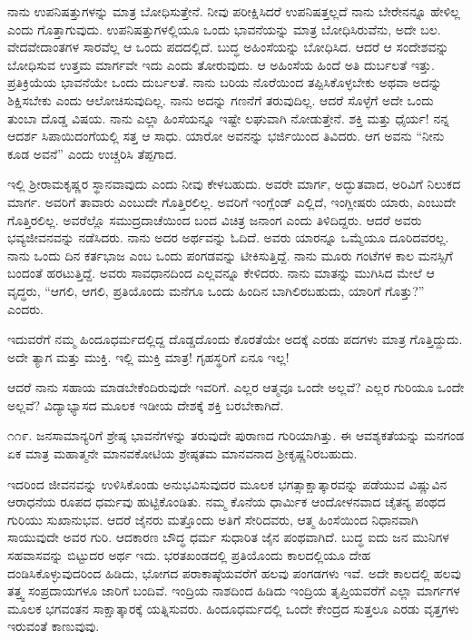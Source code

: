 ನಾನು ಉಪನಿಷತ್ತುಗಳನ್ನು ಮಾತ್ರ ಬೋಧಿಸುತ್ತೇನೆ. ನೀವು ಪರೀಕ್ಷಿಸಿದರೆ ಉಪನಿಷತ್ತಲ್ಲದೆ ನಾನು ಬೇರೇನನ್ನೂ ಹೇಳಿಲ್ಲ ಎಂದು ಗೊತ್ತಾಗುವುದು. ಉಪನಿಷತ್ತುಗಳಲ್ಲಿಯೂ ಒಂದು ಭಾವನೆಯನ್ನು ಮಾತ್ರ ಬೋಧಿಸಿರುವೆನು, ಅದೇ ಬಲ. ವೇದವೇದಾಂತಗಳ ಸಾರವೆಲ್ಲ ಆ ಒಂದು ಪದದಲ್ಲಿದೆ. ಬುದ್ಧ ಅಹಿಂಸೆಯನ್ನು ಬೋಧಿಸಿದ. ಆದರೆ ಆ ಸಂದೇಶವನ್ನು ಬೋಧಿಸುವ ಉತ್ತಮ ಮಾರ್ಗವೇ ಇದು ಎಂದು ತೋರುವುದು. ಆ ಅಹಿಂಸೆಯ ಹಿಂದೆ ಅತಿ ದುರ್ಬಲತೆ ಇತ್ತು. ಪ್ರತಿಕ್ರಿಯೆಯ ಭಾವನೆಯೇ ಒಂದು ದುರ್ಬಲತೆ. ನಾನು ಬರಿಯ ನೊರೆಯಿಂದ ತಪ್ಪಿಸಿಕೊಳ್ಳಬೇಕು ಅಥವಾ ಅದನ್ನು ಶಿಕ್ಷಿಸಬೇಕು ಎಂದು ಆಲೋಚಿಸುವುದಿಲ್ಲ. ನಾನು ಅದನ್ನು ಗಣನೆಗೆ ತರುವುದಿಲ್ಲ. ಆದರೆ ಸೊಳ್ಳೆಗೆ ಅದೇ ಒಂದು ತುಂಬಾ ದೊಡ್ಡ ವಿಷಯ. ನಾನು ಎಲ್ಲಾ ಹಿಂಸೆಯನ್ನೂ ಇಷ್ಟೇ ಲಘುವಾಗಿ ನೋಡುತ್ತೇನೆ. ಶಕ್ತಿ ಮತ್ತು ಧೈರ್ಯ! ನನ್ನ ಆದರ್ಶ ಸಿಪಾಯಿದಂಗೆಯಲ್ಲಿ ಸತ್ತ ಆ ಸಾಧು. ಯಾರೋ ಅವನನ್ನು ಭರ್ಜಿಯಿಂದ ತಿವಿದರು. ಆಗ ಅವನು “ನೀನು ಕೂಡ ಅವನೆ” ಎಂದು ಉಚ್ಚರಿಸಿ ತೆಪ್ಪಗಾದ.

ಇಲ್ಲಿ ಶ‍್ರೀರಾಮಕೃಷ್ಣರ ಸ್ಥಾನವಾವುದು ಎಂದು ನೀವು ಕೇಳಬಹುದು. ಅವರೇ ಮಾರ್ಗ, ಅದ್ಭುತವಾದ, ಅರಿವಿಗೆ ನಿಲುಕದ ಮಾರ್ಗ. ಅವರಿಗೆ ತಾವಾರು ಎಂಬುದೇ ಗೊತ್ತಿರಲಿಲ್ಲ. ಅವರಿಗೆ ಇಂಗ್ಲೆಂಡ್ ಎಲ್ಲಿದೆ, ಇಂಗ್ಲೀಷರು ಯಾರು, ಎಂಬುದೇ ಗೊತ್ತಿರಲಿಲ್ಲ. ಅವರೆಲ್ಲೊ ಸಮುದ್ರದಾಚೆಯಿಂದ ಬಂದ ವಿಚಿತ್ರ ಜನಾಂಗ ಎಂದು ತಿಳಿದಿದ್ದರು. ಆದರೆ ಅವರು ಭವ್ಯಜೀವನವನ್ನು ನಡೆಸಿದರು. ನಾನು ಅದರ ಅರ್ಥವನ್ನು ಓದಿದೆ. ಅವರು ಯಾರನ್ನೂ ಒಮ್ಮೆಯೂ ದೂರಿದವರಲ್ಲ. ನಾನು ಒಂದು ದಿನ ಕರ್ತಭಾಜ ಎಂಬ ಒಂದು ಪಂಗಡವನ್ನು ಟೀಕಿಸುತ್ತಿದ್ದೆ. ನಾನು ಮೂರು ಗಂಟೆಗಳ ಕಾಲ ಮನಸ್ಸಿಗೆ ಬಂದಂತೆ ಹರಟುತ್ತಿದ್ದೆ. ಅವರು ಸಾವಧಾನದಿಂದ ಎಲ್ಲವನ್ನೂ ಕೇಳಿದರು. ನಾನು ಮಾತನ್ನು ಮುಗಿಸಿದ ಮೇಲೆ ಆ ವೃದ್ಧರು, “ಆಗಲಿ, ಆಗಲಿ, ಪ್ರತಿಯೊಂದು ಮನೆಗೂ ಒಂದು ಹಿಂದಿನ ಬಾಗಿಲಿರಬಹುದು, ಯಾರಿಗೆ ಗೊತ್ತು?” ಎಂದರು.

ಇದುವರೆಗೆ ನಮ್ಮ ಹಿಂದೂಧರ್ಮದಲ್ಲಿದ್ದ ದೊಡ್ಡದೊಂದು ಕೊರತೆಯೇ ಅದಕ್ಕೆ ಎರಡು ಪದಗಳು ಮಾತ್ರ ಗೊತ್ತಿದ್ದುದು. ಅದೇ ತ್ಯಾಗ ಮತ್ತು ಮುಕ್ತಿ. ಇಲ್ಲಿ ಮುಕ್ತಿ ಮಾತ್ರ! ಗೃಹಸ್ಥರಿಗೆ ಏನೂ ಇಲ್ಲ!

ಆದರೆ ನಾನು ಸಹಾಯ ಮಾಡಬೇಕೆಂದಿರುವುದೇ ಇವರಿಗೆ. ಎಲ್ಲರ ಆತ್ಮವೂ ಒಂದೇ ಅಲ್ಲವೆ? ಎಲ್ಲರ ಗುರಿಯೂ ಒಂದೇ ಅಲ್ಲವೆ? ವಿದ್ಯಾಭ್ಯಾಸದ ಮೂಲಕ ಇಡೀಯ ದೇಶಕ್ಕೆ ಶಕ್ತಿ ಬರಬೇಕಾಗಿದೆ.

೧೧೯. ಜನಸಾಮಾನ್ಯರಿಗೆ ಶ್ರೇಷ್ಠ ಭಾವನೆಗಳನ್ನು ತರುವುದೇ ಪುರಾಣದ ಗುರಿಯಾಗಿತ್ತು. ಈ ಆವಶ್ಯಕತೆಯನ್ನು ಮನಗಂಡ ಏಕ ಮಾತ್ರ ಮಹಾತ್ಮನೇ ಮಾನವಕೋಟಿಯ ಶ್ರೇಷ್ಠತಮ ಮಾನವನಾದ ಶ‍್ರೀಕೃಷ್ಣನಿರಬಹುದು.

ಇದರಿಂದ ಜೀವನವನ್ನು ಉಳಿಸಿಕೊಂಡು ಅನುಭವಿಸುವುದರ ಮೂಲಕ ಭಗತ್ಸಾಕ್ಷಾತ್ಕಾರವನ್ನು ಪಡೆಯುವ ವಿಷ್ಣುವಿನ ಆರಾಧನೆಯ ರೂಪದ ಧರ್ಮವು ಹುಟ್ಟಿಕೊಂಡಿತು. ನಮ್ಮ ಕೊನೆಯ ಧಾರ್ಮಿಕ ಆಂದೋಳನವಾದ ಚೈತನ್ಯ ಪಂಥದ ಗುರಿಯು ಸುಖಾನುಭವ. ಆದರೆ ಜೈನರು ಮತ್ತೊಂದು ಅತಿಗೆ ಸೇರಿದವರು, ಆತ್ಮ ಹಿಂಸೆಯಿಂದ ನಿಧಾನವಾಗಿ ಸಾಯುವುದೇ ಅವರ ಗುರಿ. ಆದಕಾರಣ ಬೌದ್ಧ ಧರ್ಮ ಸುಧಾರಿತ ಜೈನ ಪಂಥವಾಗಿದೆ. ಬುದ್ಧ ಐದು ಜನ ಮುನಿಗಳ ಸಹವಾಸವನ್ನು ಬಿಟ್ಟುದರ ಅರ್ಥ ಇದು. ಭರತಖಂಡದಲ್ಲಿ ಪ್ರತಿಯೊಂದು ಕಾಲದಲ್ಲಿಯೂ ದೇಹ ದಂಡಿಸಿಕೊಳ್ಳುವುದರಿಂದ ಹಿಡಿದು, ಭೋಗದ ಪರಾಕಾಷ್ಠೆಯವರೆಗೆ ಹಲವು ಪಂಗಡಗಳು ಇವೆ. ಅದೇ ಕಾಲದಲ್ಲಿ ಹಲವು ತತ್ತ್ವ ಸಂಪ್ರದಾಯಗಳೂ ಜಾರಿಗೆ ಬಂದಿವೆ. ಇಂದ್ರಿಯ ನಾಶದಿಂದ ಹಿಡಿದು ಇಂದ್ರಿಯ ತೃಪ್ತಿಯವರೆಗೆ ಎಲ್ಲಾ ಮಾರ್ಗಗಳ ಮೂಲಕ ಭಗವಂತನ ಸಾಕ್ಷಾತ್ಕಾರಕ್ಕೆ ಯತ್ನಿಸುವರು. ಹಿಂದೂಧರ್ಮದಲ್ಲಿ ಒಂದೇ ಕೇಂದ್ರದ ಸುತ್ತಲೂ ಎರಡು ವೃತ್ತಗಳು ಇರುವಂತೆ ಕಾಣುವುವು.

